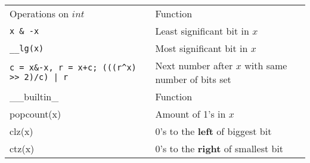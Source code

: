 \begin{tabular}{ |p{3cm}|p{5cm}|  }
  \hline  
  \rowcolor{LightBlue2} 
  \multicolumn{2}{|c|}{Bits++} \\
  \hline
  \rowcolor{LightBlue2} 
  Operations on $int$ & Function \\
  \hline
  \texttt{x \& -x} & Least significant bit in $x$ \\
  \rowcolor{Gray} 
  \texttt{\_\_lg(x)} & Most significant bit in $x$ \\
  \texttt{c = x\&-x, r = x+c; (((r\^{}x) >> 2)/c) | r} & Next number after $x$ with same number of bits set \\
  \hline

  \rowcolor{LightBlue2} 
  \_\_builtin\_ & Function \\
  \hline 
  popcount(x) & Amount of 1's in $x$ \\
  \rowcolor{Gray} 
  clz(x) & 0's to the \textbf{left} of biggest bit \\
  ctz(x) & 0's to the \textbf{right} of smallest bit \\
  \hline
\end{tabular}